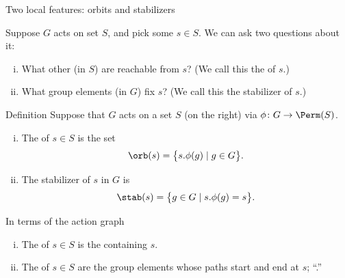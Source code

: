 \documentclass[8pt, handout]{beamer}
\newcommand{\Pause}{}      %
\begin{document}

\begin{frame}{Two local features: orbits and stabilizers} %
  
  Suppose $G$ acts on set $S$, and pick some $s\in S$. We can ask two
  questions about it: \Pause
  
  \begin{enumerate}[(i)]
  \item What other  (in $S$) are reachable from $s$?
    (We call this the  of $s$.) \smallskip\Pause
  \item What {\color{xBlue}group elements} (in $G$) fix $s$?  (We
    call this the {\color{xBlue}stabilizer} of $s$.)
  \end{enumerate}
  
  \Pause
  
  \begin{block}{Definition}
    Suppose that $G$ acts on a set $S$ (on the right)
    via $\phi\colon G\to\Perm(S)$. \smallskip\Pause
    \begin{enumerate}[(i)]
    \item The  of $s\in S$ is the set 
      \[
      \orb(s)=\big\{s.\phi(g)\mid g\in G\big\}.
      \]
      \Pause\vspace{-5mm}
    \item The {\color{xBlue}stabilizer} of $s$ in $G$ is
      \[
      \stab(s)=\big\{g\in G\mid s.\phi(g)=s\big\}.
      \]
    \end{enumerate}
  \end{block}
  
  \Pause
  
  \begin{exampleblock}{In terms of the action graph}
    \begin{enumerate}[(i)]
    \item The  of $s\in S$ is the  containing $s$. \Pause
    \item The  of $s\in S$ are the group elements
      whose paths start and end at $s$; ``.''
    \end{enumerate}
  \end{exampleblock}
  
\end{frame}

\end{document}
